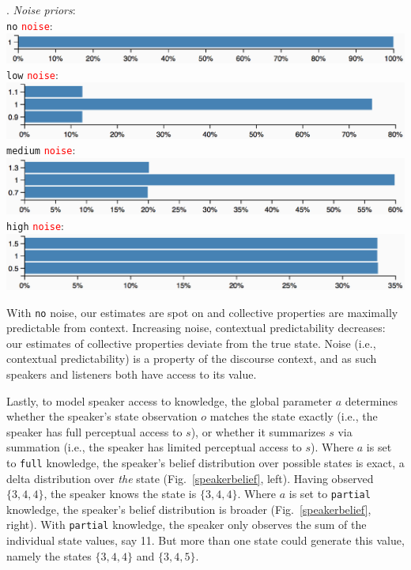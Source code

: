 \documentclass[linguex]{sp}
\begin{document}
\ex. \emph{Noise priors}:\\[5pt]
\texttt{no} \textcolor{red}{\texttt{noise}}:\\[2pt]
\includegraphics[width=\linewidth]{images/no-noise.eps}\\[5pt]
\texttt{low} \textcolor{red}{\texttt{noise}}:\\[2pt]
\includegraphics[width=\linewidth]{images/low-noise.eps}\\[5pt]
\texttt{medium} \textcolor{red}{\texttt{noise}}:\\[2pt]
\includegraphics[width=\linewidth]{images/mid-noise.eps}\\[5pt]
\texttt{high} \textcolor{red}{\texttt{noise}}:\\[2pt]
\includegraphics[width=\linewidth]{images/high-noise.eps}

With \texttt{no} noise, our estimates are spot on and collective properties are maximally predictable from context. Increasing noise, contextual predictability decreases: our estimates of collective properties deviate from the true state. Noise (i.e., contextual predictability) is a property of the discourse context, and as such speakers and listeners both have access to its value.

Lastly, to model speaker access to knowledge, the global parameter $a$ determines whether the speaker's state observation $o$ matches the state exactly (i.e., the speaker has full perceptual access to $s$), or whether it summarizes $s$ via summation (i.e., the speaker has limited perceptual access to $s$). Where $a$ is set to \texttt{full} knowledge, the speaker's belief distribution over possible states is exact, a delta distribution over \emph{the} state (Fig.~\ref{speakerbelief}, left). Having observed $\{3,4,4\}$, the speaker knows the state is $\{3,4,4\}$. Where $a$ is set to \texttt{partial} knowledge, the speaker's belief distribution is broader (Fig.~\ref{speakerbelief}, right). With \texttt{partial} knowledge, the speaker only observes the sum of the individual state values, say 11. But more than one state could generate this value, namely the states $\{3,4,4\}$ and $\{3,4,5\}$.
\end{document}

